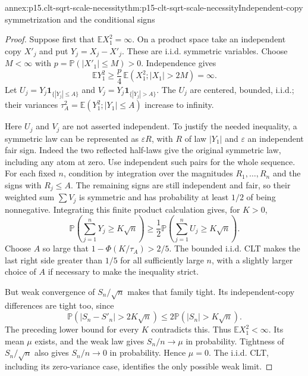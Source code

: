 \begin{annexitem}{annex:p15.clt-sqrt-scale-necessity}{thm:p15-clt-sqrt-scale-necessity}{Independent-copy symmetrization and the conditional signs}
\begin{proof}
Suppose first that \(\mathbb EX_1^2=\infty\).
On a product space take an independent copy \(X'_j\) and put
\(Y_j=X_j-X'_j\). These are i.i.d. symmetric variables.
Choose \(M<\infty\) with \(p=\mathbb P(|X'_1|\leq M)>0\).
Independence gives
\[
 \mathbb EY_1^2\geq
 \frac p4\,\mathbb E(X_1^2;|X_1|>2M)=\infty.
 \]
Let \(U_j=Y_j\mathbf1_{\{|Y_j|\leq A\}}\) and
\(V_j=Y_j\mathbf1_{\{|Y_j|>A\}}\).
The \(U_j\) are centered, bounded, i.i.d.; their variances
\(\tau_A^2=\mathbb E(Y_1^2;|Y_1|\leq A)\) increase to infinity.

Here \(U_j\) and \(V_j\) are not asserted independent.
To justify the needed inequality, a symmetric law can be
represented as \(\varepsilon R\), with \(R\) of law \(|Y_1|\)
and \(\varepsilon\) an independent fair sign. Indeed the two
reflected half-laws give the original symmetric law, including
any atom at zero. Use independent such pairs for the whole sequence.
For each fixed \(n\), condition by integration over the magnitudes
\(R_1,\ldots,R_n\) and the signs with \(R_j\leq A\).
The remaining signs are still independent and fair, so their
weighted sum \(\sum V_j\) is symmetric and has probability at
least \(1/2\) of being nonnegative. Integrating this finite product
calculation gives, for \(K>0\),
\[
 \mathbb P\left(\sum_{j=1}^nY_j\geq K\sqrt n\right)
 \geq\frac12\mathbb P\left(\sum_{j=1}^nU_j\geq K\sqrt n\right).
 \]
Choose \(A\) so large that
\(1-\Phi(K/\tau_A)>2/5\).
The bounded i.i.d. CLT makes the last right side greater than
\(1/5\) for all sufficiently large \(n\), with a slightly larger
choice of \(A\) if necessary to make the inequality strict.

But weak convergence of \(S_n/\sqrt n\) makes that family tight.
Its independent-copy differences are tight too, since
\[
 \mathbb P(|S_n-S'_n|>2K\sqrt n)
 \leq2\mathbb P(|S_n|>K\sqrt n).
 \]
The preceding lower bound for every \(K\) contradicts this.
Thus \(\mathbb EX_1^2<\infty\).
Its mean \(\mu\) exists, and the weak law gives \(S_n/n\to\mu\)
in probability. Tightness of \(S_n/\sqrt n\) also gives
\(S_n/n\to0\) in probability. Hence \(\mu=0\).
The i.i.d. CLT, including its zero-variance case, identifies the
only possible weak limit.
\end{proof}
\end{annexitem}

